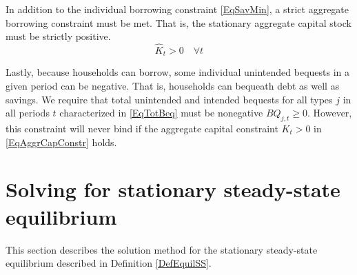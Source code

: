 \documentclass[letterpaper,12pt]{article}
\theoremstyle{definition}
\renewcommand\theenumi{\roman{enumi}}
\begin{document}
  In addition to the individual borrowing constraint \eqref{EqSavMin}, a strict aggregate borrowing constraint must be met. That is, the stationary aggregate capital stock must be strictly positive.
  \begin{equation}\label{EqAggrCapConstr}
    \hat{K}_t > 0 \quad\forall t
  \end{equation}

  Lastly, because households can borrow, some individual unintended bequests in a given period can be negative. That is, households can bequeath debt as well as savings. We require that total unintended and intended bequests for all types $j$ in all periods $t$ characterized in \eqref{EqTotBeq} must be nonegative $BQ_{j,t}\geq 0$. However, this constraint will never bind if the aggregate capital constraint $K_t>0$ in \eqref{EqAggrCapConstr} holds.


\newpage
\section{Solving for stationary steady-state equilibrium}\label{AppSSsolve}

  \setcounter{equation}{0}
  \renewcommand\theenumi{\arabic{enumi}}
  \renewcommand\theenumii{\alph{enumii}}
  \renewcommand\theenumiii{\roman{enumiii}}

  This section describes the solution method for the stationary steady-state equilibrium described in Definition \ref{DefEquilSS}.
\end{document}
